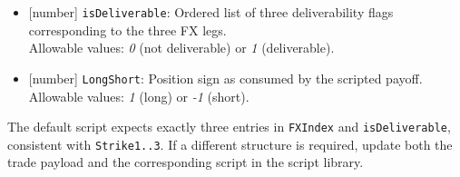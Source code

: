 \begin{itemize}
	\item{}[number] \lstinline!isDeliverable!: Ordered list of three deliverability flags corresponding
		to the three FX legs. \\
		Allowable values: \emph{0} (not deliverable) or \emph{1} (deliverable).

	\item{}[number] \lstinline!LongShort!: Position sign as consumed by the scripted payoff. \\
		Allowable values: \emph{1} (long) or \emph{-1} (short).
\end{itemize}

The default script expects exactly three entries in \lstinline!FXIndex! and
\lstinline!isDeliverable!, consistent with \lstinline!Strike1..3!. If a different
structure is required, update both the trade payload and the corresponding
script in the script library.
